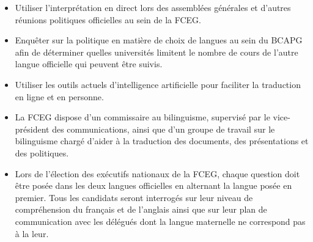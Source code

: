 \begin{itemize}
 \item Utiliser l'interprétation en direct lors des assemblées générales et d'autres réunions politiques officielles au sein de la FCEG.
 \item Enquêter sur la politique en matière de choix de langues au sein du BCAPG afin de déterminer quelles universités limitent le nombre de cours de l'autre langue officielle qui peuvent être suivis.
 \item Utiliser les outils actuels d'intelligence artificielle pour faciliter la traduction en ligne et en personne.
 \item La FCEG dispose d'un commissaire au bilinguisme, supervisé par le vice-président des communications, ainsi que d'un groupe de travail sur le bilinguisme chargé d'aider à la traduction des documents, des présentations et des politiques.
 \item Lors de l'élection des exécutifs nationaux de la FCEG, chaque question doit être posée dans les deux langues officielles en alternant la langue posée en premier. Tous les candidats seront interrogés sur leur niveau de compréhension du français et de l'anglais ainsi que sur leur plan de communication avec les délégués dont la langue maternelle ne correspond pas à la leur.
\end{itemize}

